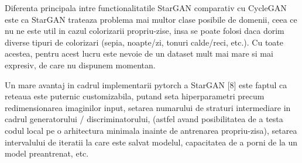 \documentclass[12pt]{article}
\theoremstyle{definition}
\begin{document}
Diferenta principala intre functionalitatile StarGAN comparativ cu CycleGAN este ca StarGAN trateaza problema mai multor clase posibile de domenii, ceea ce nu ne este util in cazul colorizarii propriu-zise, insa se poate folosi daca dorim diverse tipuri de colorizari (sepia, noapte/zi, tonuri calde/reci, etc.). Cu toate acestea, pentru acest lucru este nevoie de un dataset mult mai mare si mai expresiv, de care nu dispunem momentan.

Un mare avantaj in cadrul implementarii pytorch a StarGAN [8] este faptul ca reteaua este puternic customizabila, putand seta hiperparametri precum redimensionarea imaginilor input, setarea numarului de straturi intermediare in cadrul generatorului / discriminatorului, (astfel avand posibilitatea de a testa codul local pe o arhitectura minimala inainte de antrenarea propriu-zisa), setarea intervalului de iteratii la care este salvat modelul, capacitatea de a porni de la un model preantrenat, etc.
\end{document}
